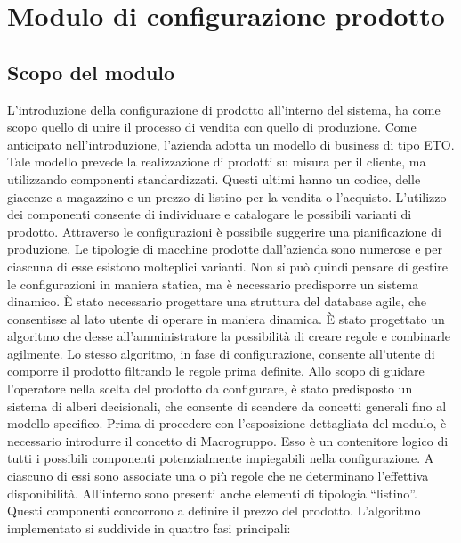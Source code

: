 \chapter{Modulo di configurazione prodotto}\label{chapter:Configurazione}
\section{Scopo del modulo}
L'introduzione della configurazione di prodotto all'interno del sistema,
ha come scopo quello di unire il processo di vendita con quello di produzione.
Come anticipato nell'introduzione, l'azienda adotta un modello di business
di tipo \ac{ETO}. Tale modello prevede la realizzazione di prodotti su misura per il cliente, ma
utilizzando componenti standardizzati.
Questi ultimi hanno un codice, delle giacenze a magazzino e un prezzo
di listino per la vendita o l'acquisto.
L'utilizzo dei componenti consente di individuare e catalogare
le possibili varianti di prodotto. Attraverso le configurazioni è possibile
suggerire una pianificazione di produzione.
Le tipologie di macchine prodotte dall'azienda sono numerose e per ciascuna di esse esistono molteplici varianti.
Non si può quindi pensare di gestire le configurazioni in maniera statica, ma è necessario
predisporre un sistema dinamico.
È stato necessario progettare una struttura del database agile,
che consentisse al lato utente di operare in maniera dinamica.
È stato progettato un algoritmo che desse all'amministratore la possibilità di creare regole e combinarle agilmente.
Lo stesso algoritmo, in fase di configurazione, consente all'utente di comporre il prodotto
filtrando le regole prima definite.
Allo scopo di guidare l'operatore nella scelta del prodotto da configurare,
è stato predisposto un sistema di alberi decisionali, che consente di scendere da concetti generali fino al modello specifico.
Prima di procedere con l'esposizione dettagliata del modulo, è necessario introdurre il concetto di Macrogruppo.
Esso è un contenitore logico di tutti i possibili componenti potenzialmente impiegabili nella configurazione.
A ciascuno di essi sono associate una o più regole che ne determinano l'effettiva disponibilità.
All'interno sono presenti anche elementi di tipologia ``listino''.
Questi componenti concorrono a definire il prezzo del prodotto.
L'algoritmo implementato si suddivide in quattro fasi principali:
